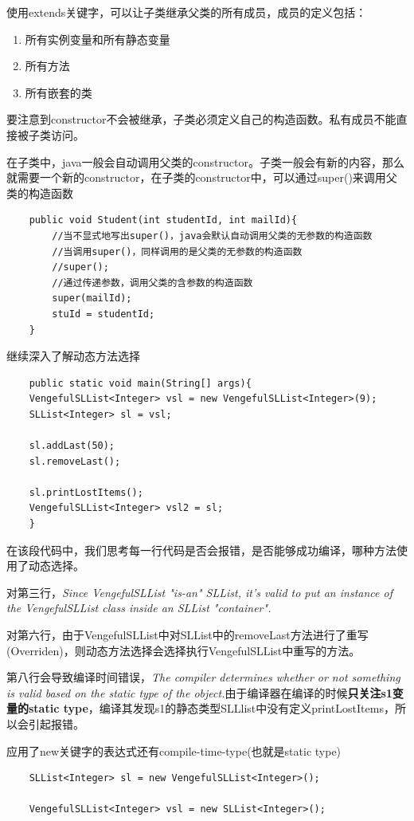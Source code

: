 \documentclass[12pt, a4paper, openany]{ctexbook} %
\begin{document}
使用extends关键字，可以让子类继承父类的所有成员，成员的定义包括：
\begin{enumerate}
    \item 所有实例变量和所有静态变量
    \item 所有方法
    \item 所有嵌套的类
\end{enumerate}\par
要注意到constructor不会被继承，子类必须定义自己的构造函数。私有成员不能直接被子类访问。
\par
在子类中，java一般会自动调用父类的constructor。子类一般会有新的内容，那么就需要一个新的constructor，在子类的constructor中，可以通过super()来调用父类的构造函数
\begin{lstlisting}
    public void Student(int studentId, int mailId){
        //当不显式地写出super()，java会默认自动调用父类的无参数的构造函数
        //当调用super()，同样调用的是父类的无参数的构造函数
        //super();
        //通过传递参数，调用父类的含参数的构造函数
        super(mailId);
        stuId = studentId;
    }
\end{lstlisting}
\par
继续深入了解动态方法选择
\begin{lstlisting}
    public static void main(String[] args){
    VengefulSLList<Integer> vsl = new VengefulSLList<Integer>(9);
    SLList<Integer> sl = vsl;

    sl.addLast(50);
    sl.removeLast();

    sl.printLostItems();
    VengefulSLList<Integer> vsl2 = sl;
    }
\end{lstlisting}
\par
在该段代码中，我们思考每一行代码是否会报错，是否能够成功编译，哪种方法使用了动态选择。
\par
对第三行，\textit{Since VengefulSLList "is-an" SLList, it's valid to put an instance of the VengefulSLList class inside an SLList "container".}
\par
对第六行，由于VengefulSLList中对SLList中的removeLast方法进行了重写(Overriden)，则动态方法选择会选择执行VengefulSLList中重写的方法。
\par
第八行会导致编译时间错误，\textit{The compiler determines whether or not something is valid based on the static type of the object.}由于编译器在编译的时候\textbf{只关注s1变量的static type}，编译其发现s1的静态类型SLLlist中没有定义printLostItems，所以会引起报错。
\par
应用了new关键字的表达式还有compile-time-type(也就是static type)
\begin{lstlisting}
    SLList<Integer> sl = new VengefulSLList<Integer>();

    VengefulSLList<Integer> vsl = new SLList<Integer>();
\end{lstlisting}
\end{document}
